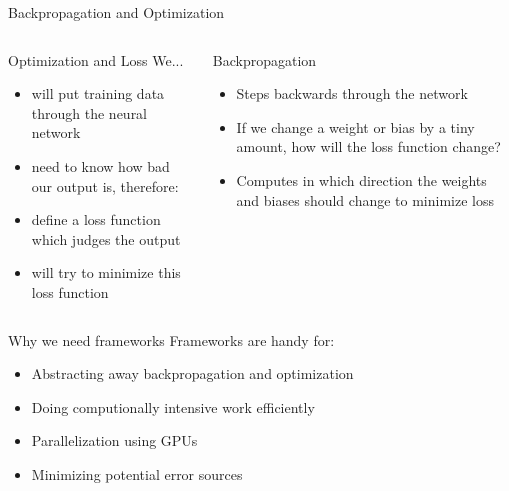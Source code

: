 \documentclass[aspectratio=169]{beamer}
\begin{document}
	\begin{frame}{Backpropagation and Optimization}
		\begin{columns}[T]
			\begin{column}{.5\textwidth}
		    	\begin{block}{Optimization and Loss}
		    		We...
		    		\begin{itemize}
		    			\item will put training data through the neural network
		    			\item need to know how bad our output is, therefore:
		    			\item define a loss function which judges the output
		    			\item will try to minimize this loss function
		    		\end{itemize}
		    	\end{block}
		    \end{column}
		    \begin{column}{.5\textwidth}
		    	\begin{block}{Backpropagation}
					\begin{itemize}
						\item Steps backwards through the network
						\item If we change a weight or bias by a tiny amount, how will the loss function change?
						\item Computes in which direction the weights and biases should change to minimize loss
					\end{itemize}
		   		\end{block}
		    \end{column}
		  \end{columns}
	\end{frame}

	\begin{frame}{Why we need frameworks}
		Frameworks are handy for:
		\begin{itemize}
			\item Abstracting away backpropagation and optimization
			\item Doing computionally intensive work efficiently
			\item Parallelization using GPUs
			\item Minimizing potential error sources
		\end{itemize}
	\end{frame}
\end{document}

